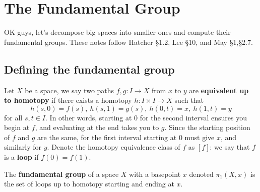 \section{The Fundamental Group}
OK guys, let's decompose big spaces into smaller ones and compute their fundamental groups. These notes follow Hatcher \S 1.2, Lee \S 10, and May \S 1,\S 2.7.
\subsection{Defining the fundamental group}
Let $X$ be a space, we say two paths $f,g \colon I \to X$ from $x$ to $y$ are \textbf{equivalent up to homotopy} if there exists a homotopy $h\colon I\times I \to X     $ such that 
\[
    h(s,0)=f(s),\ h(s,1)=g(s),\ h(0,t)=x,\ h(1,t)=y
\] for all $s,t\in I$. In other words, starting at $0$ for the second interval ensures you begin at $f$, and evaluating at the end takes you to $g$. Since the starting position of $f$ and $g$ are the same, for the first interval starting at $0$ must give $x$, and similarly for $y$. Denote the homotopy equivalence class of $f$ as $[f]$: we say that $f$ is a \textbf{loop} if $f(0)=f(1)$.
\begin{definition}
    The \textbf{fundamental group} of a space $X$ with a basepoint $x$ denoted $\pi_1(X,x)$ is the set of loops up to homotopy starting and ending at $x$.
\end{definition}


